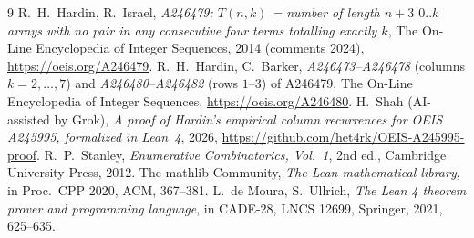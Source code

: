\documentclass[11pt]{article}
\theoremstyle{remark}\newtheorem{remark}[theorem]{Remark}
\begin{document}
\begin{thebibliography}{9}
 R.~H.~Hardin, R.~Israel, \emph{A246479: $T(n,k)$ = number of length $n+3$ $0..k$ arrays with no pair in any consecutive four terms totalling exactly $k$}, The On-Line Encyclopedia of Integer Sequences, 2014 (comments 2024), \url{https://oeis.org/A246479}.
 R.~H.~Hardin, C.~Barker, \emph{A246473--A246478} (columns $k=2,\dots,7$) and \emph{A246480--A246482} (rows $1$--$3$) of A246479, The On-Line Encyclopedia of Integer Sequences, \url{https://oeis.org/A246480}.
 H.~Shah (AI-assisted by Grok), \emph{A proof of Hardin's empirical column recurrences for OEIS A245995, formalized in Lean~4}, 2026, \url{https://github.com/het4rk/OEIS-A245995-proof}.
 R.~P.~Stanley, \emph{Enumerative Combinatorics, Vol.~1}, 2nd ed., Cambridge University Press, 2012.
 The mathlib Community, \emph{The Lean mathematical library}, in Proc.\ CPP 2020, ACM, 367--381.
 L.~de Moura, S.~Ullrich, \emph{The Lean 4 theorem prover and programming language}, in CADE-28, LNCS 12699, Springer, 2021, 625--635.
\end{thebibliography}
\end{document}

